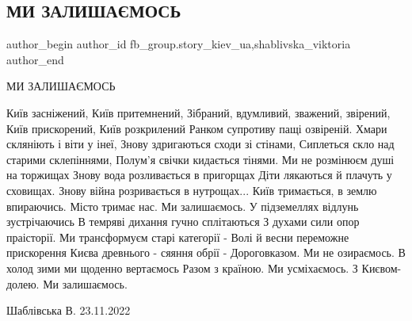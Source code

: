  
 
 
 
 
 
\subsection{МИ ЗАЛИШАЄМОСЬ}
\label{sec:24_11_2022.fb.fb_group.story_kiev_ua.1.my_zalyshaemost}
 
\ifcmt
 author_begin
   author_id fb_group.story_kiev_ua,shablivska_viktoria
 author_end
\fi

МИ ЗАЛИШАЄМОСЬ


\obeycr
Київ засніжений, Київ притемнений,
Зібраний, вдумливий, зважений, звірений,
Київ прискорений, Київ розкрилений
Ранком супротиву пащі озвіреній.
Хмари скляніють і віти у інеї,    
Знову здригаються сходи зі стінами,
Сиплеться скло над старими склепіннями,
Полум'я свічки кидається тінями.
Ми не розмінюєм душі на торжищах
Знову вода розливається в пригорщах
Діти лякаються й плачуть у сховищах.
Знову війна розривається в нутрощах...
Київ тримається, в землю впираючись.
Місто тримає нас. Ми залишаємось.
У підземеллях відлунь зустрічаючись
В темряві дихання гучно сплітаються 
З духами сили опор праісторії.
Ми трансформуєм старі категорії -
Волі й весни переможне прискорення
Києва древнього - сяяння обрії -
Дороговказом. Ми не озираємось.
В холод зими ми щоденно вертаємось
Разом з країною. Ми усміхаємось.
З Києвом-долею. Ми залишаємось.
\restorecr

Шаблівська В.  23.11.2022

